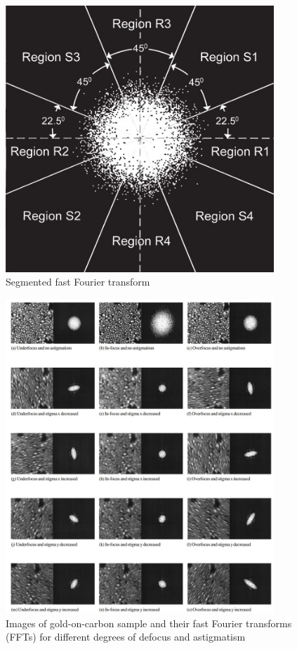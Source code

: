 \documentclass{article}
\begin{document}
\begin{figure}
    \centering
    \includegraphics[width=0.9\textwidth]{Images/FFT regions.jpg}
    \caption{Segmented fast Fourier transform \cite{SEM astigmatation correction algorithm}}
    \label{FFT regions}
\end{figure}

\begin{figure}
    \centering
    \includegraphics[width=0.9\textwidth]{Images/SEM astigmatism.jpg}
    \caption{Images of gold-on-carbon sample and their fast Fourier transforms (FFTs) for different degrees of defocus and astigmatism \cite{SEM astigmatation correction algorithm}}
    \label{SEM astigmatism}
\end{figure}
\end{document}
